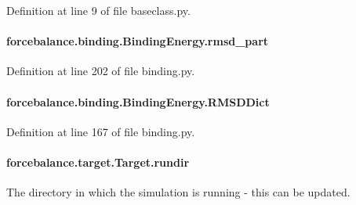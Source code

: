 Definition at line 9 of file baseclass.\-py.

\hypertarget{classforcebalance_1_1binding_1_1BindingEnergy_a9503044f7d14bfd9f8dc98dbe7950685}{
\paragraph[{rmsd\-\_\-part}]{\setlength{\rightskip}{0pt plus 5cm}forcebalance.\-binding.\-Binding\-Energy.\-rmsd\-\_\-part}}\label{classforcebalance_1_1binding_1_1BindingEnergy_a9503044f7d14bfd9f8dc98dbe7950685}


Definition at line 202 of file binding.\-py.

\hypertarget{classforcebalance_1_1binding_1_1BindingEnergy_a5f2f2a25d42e1b27f17fa7b289f0dd26}{
\paragraph[{R\-M\-S\-D\-Dict}]{\setlength{\rightskip}{0pt plus 5cm}forcebalance.\-binding.\-Binding\-Energy.\-R\-M\-S\-D\-Dict}}\label{classforcebalance_1_1binding_1_1BindingEnergy_a5f2f2a25d42e1b27f17fa7b289f0dd26}


Definition at line 167 of file binding.\-py.

\hypertarget{classforcebalance_1_1target_1_1Target_a6872de5b2d4273b82336ea5b0da29c9e}{
\paragraph[{rundir}]{\setlength{\rightskip}{0pt plus 5cm}forcebalance.\-target.\-Target.\-rundir\hspace{0.3cm}{\ttfamily [inherited]}}}\label{classforcebalance_1_1target_1_1Target_a6872de5b2d4273b82336ea5b0da29c9e}


The directory in which the simulation is running -\/ this can be updated. 

